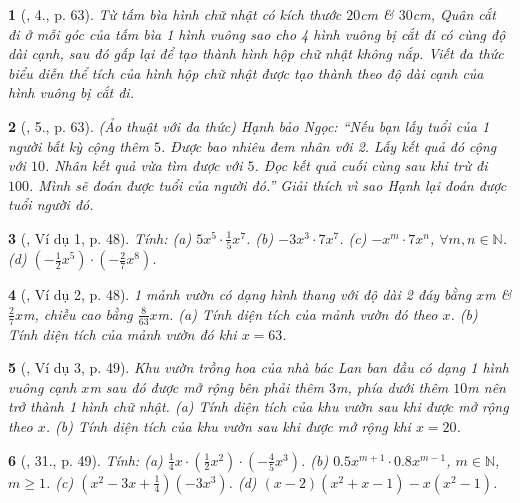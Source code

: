 \documentclass{article}
\newtheorem{baitoan}{}
\begin{document}
\begin{baitoan}[\cite{SGK_Toan_7_Canh_Dieu_tap_2}, 4., p. 63]
	Từ tấm bìa hình chữ nhật có kích thước $20$\emph{cm} \& $30$\emph{cm}, Quân cắt đi ở mỗi góc của tấm bìa 1 hình vuông sao cho 4 hình vuông bị cắt đi có cùng độ dài cạnh, sau đó gấp lại để tạo thành hình hộp chữ nhật không nắp. Viết đa thức biểu diễn thể tích của hình hộp chữ nhật được tạo thành theo độ dài cạnh của hình vuông bị cắt đi.
\end{baitoan}

\begin{baitoan}[\cite{SGK_Toan_7_Canh_Dieu_tap_2}, 5., p. 63]
	\emph{(Ảo thuật với đa thức)} Hạnh bảo Ngọc: ``Nếu bạn lấy tuổi của 1 người bất kỳ cộng thêm $5$. Được bao nhiêu đem nhân với 2. Lấy kết quả đó cộng với $10$. Nhân kết quả vừa tìm được với $5$. Đọc kết quả cuối cùng sau khi trừ đi $100$. Mình sẽ đoán được tuổi của người đó.'' Giải thích vì sao Hạnh lại đoán được tuổi người đó.
\end{baitoan}

\begin{baitoan}[\cite{SBT_Toan_7_Canh_Dieu_tap_2}, Ví dụ 1, p. 48]
	Tính: (a) $5x^5\cdot\frac{1}{5}x^7$. (b) $-3x^3\cdot7x^7$. (c) $-x^m\cdot7x^n$, $\forall m,n\in\mathbb{N}$. (d) $\left(-\frac{1}{2}x^5\right)\cdot\left(-\frac{2}{7}x^8\right)$.
\end{baitoan}

\begin{baitoan}[\cite{SBT_Toan_7_Canh_Dieu_tap_2}, Ví dụ 2, p. 48]
	1 mảnh vườn có dạng hình thang với độ dài 2 đáy bằng $x$\emph{m} \& $\frac{2}{7}x$\emph{m}, chiều cao bằng $\frac{8}{63}x$\emph{m}. (a) Tính diện tích của mảnh vườn đó theo $x$. (b) Tính diện tích của mảnh vườn đó khi $x = 63$.
\end{baitoan}

\begin{baitoan}[\cite{SBT_Toan_7_Canh_Dieu_tap_2}, Ví dụ 3, p. 49]
	Khu vườn trồng hoa của nhà bác Lan ban đầu có dạng 1 hình vuông cạnh $x$\emph{m} sau đó được mở rộng bên phải thêm $3$\emph{m}, phía dưới thêm $10$\emph{m} nên trở thành 1 hình chữ nhật. (a) Tính diện tích của khu vườn sau khi được mở rộng theo $x$. (b) Tính diện tích của khu vườn sau khi được mở rộng khi $x = 20$.
\end{baitoan}

\begin{baitoan}[\cite{SBT_Toan_7_Canh_Dieu_tap_2}, 31., p. 49]
	Tính: (a) $\frac{1}{4}x\cdot\left(\frac{1}{2}x^2\right)\cdot\left(-\frac{4}{5}x^3\right)$. (b) $0.5x^{m+1}\cdot0.8x^{m-1}$, $m\in\mathbb{N}$, $m\ge1$. (c) $\left(x^2 - 3x + \frac{1}{4}\right)(-3x^3)$. (d) $(x - 2)(x^2 + x - 1) - x(x^2 - 1)$.
\end{baitoan}
\end{document}
